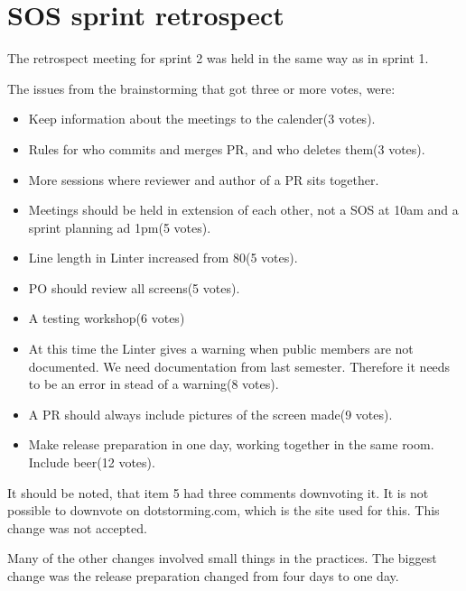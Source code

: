 \section{SOS sprint retrospect}

The retrospect meeting for sprint 2 was held in the same way as in sprint 1.

The issues from the brainstorming that got three or more votes, were:
\begin{itemize}
    \item Keep information about the meetings to the calender(3 votes).
    \item Rules for who commits and merges \gls{PR}, and who deletes them(3 votes).
    \item More sessions where reviewer and author of a \gls{PR} sits together. 
    \item Meetings should be held in extension of each other, not a SOS at 10am and a sprint planning ad 1pm(5 votes).  
    \item Line length in Linter increased from 80(5 votes).    
    \item PO should review all screens(5 votes).
    \item A testing workshop(6 votes)
    \item At this time the Linter gives a warning when public members are not documented. We need documentation from last semester. Therefore it needs to be an error in stead of a warning(8 votes).
    \item A \gls{PR} should always include pictures of the screen made(9 votes).
    \item Make release preparation in one day, working together in the same room. Include beer(12 votes).
\end{itemize}

It should be noted, that item 5 had three comments downvoting it. It is not possible to downvote on dotstorming.com, which is the site used for this. This change was not accepted.

Many of the other changes involved small things in the practices. The biggest change was the release preparation changed from four days to one day.\\
